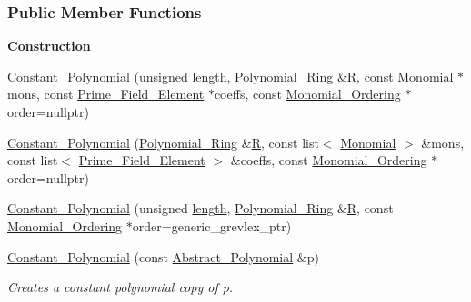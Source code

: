 \subsubsection*{Public Member Functions}
\begin{Indent}\textbf{ Construction}\par
\begin{DoxyCompactItemize}
\item 
\hyperlink{group__polygroup_a17e78adc39df3472a0610b17c906898f}{Constant\+\_\+\+Polynomial} (unsigned \hyperlink{group__polygroup_a9a6bcfaf1f4d6260b39f6abfb2b646ea}{length}, \hyperlink{group__polygroup_class_polynomial___ring}{Polynomial\+\_\+\+Ring} \&\hyperlink{group__polygroup_a551ade20b7dcd96c227dd0401f6ffbbe}{R}, const \hyperlink{group__polygroup_class_monomial}{Monomial} $\ast$mons, const \hyperlink{group___fields_group_class_prime___field___element}{Prime\+\_\+\+Field\+\_\+\+Element} $\ast$coeffs, const \hyperlink{group__orderinggroup_class_monomial___ordering}{Monomial\+\_\+\+Ordering} $\ast$order=nullptr)
\item 
\hyperlink{group__polygroup_ac8bd342911678053e14cf72af46819c5}{Constant\+\_\+\+Polynomial} (\hyperlink{group__polygroup_class_polynomial___ring}{Polynomial\+\_\+\+Ring} \&\hyperlink{group__polygroup_a551ade20b7dcd96c227dd0401f6ffbbe}{R}, const list$<$ \hyperlink{group__polygroup_class_monomial}{Monomial} $>$ \&mons, const list$<$ \hyperlink{group___fields_group_class_prime___field___element}{Prime\+\_\+\+Field\+\_\+\+Element} $>$ \&coeffs, const \hyperlink{group__orderinggroup_class_monomial___ordering}{Monomial\+\_\+\+Ordering} $\ast$order=nullptr)
\item 
\hyperlink{group__polygroup_abbc487b48dbf5d0dc25dfb419a341ea5}{Constant\+\_\+\+Polynomial} (unsigned \hyperlink{group__polygroup_a9a6bcfaf1f4d6260b39f6abfb2b646ea}{length}, \hyperlink{group__polygroup_class_polynomial___ring}{Polynomial\+\_\+\+Ring} \&\hyperlink{group__polygroup_a551ade20b7dcd96c227dd0401f6ffbbe}{R}, const \hyperlink{group__orderinggroup_class_monomial___ordering}{Monomial\+\_\+\+Ordering} $\ast$order=generic\+\_\+grevlex\+\_\+ptr)
\item 
\mbox{\label{group__polygroup_a3e0e3066356e56c7245bb517b4e04284}} 
\hyperlink{group__polygroup_a3e0e3066356e56c7245bb517b4e04284}{Constant\+\_\+\+Polynomial} (const \hyperlink{group__polygroup_class_abstract___polynomial}{Abstract\+\_\+\+Polynomial} \&p)
\begin{DoxyCompactList}\small\item\em Creates a constant polynomial copy of p. \end{DoxyCompactList}\item 

\end{DoxyCompactItemize}
\end{Indent}
